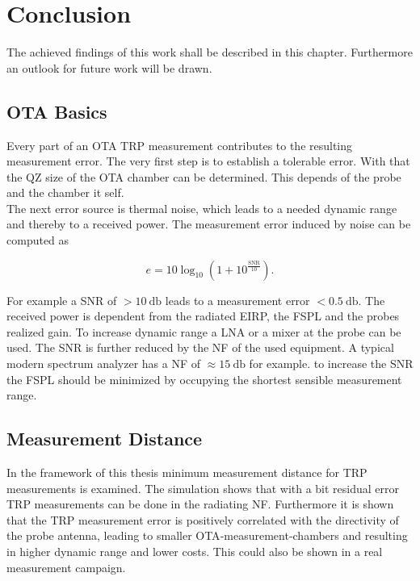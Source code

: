 \chapter{Conclusion}

The achieved findings of this work shall be described in this chapter. Furthermore an outlook for future work will be drawn.

\section{OTA Basics}

Every part of an \acf{OTA} \acf{TRP} measurement contributes to the resulting measurement error. The very first step is to establish a tolerable error. With that the \acf{QZ} size of the \ac{OTA} chamber can be determined. This depends of the probe and the chamber it self.\\
The next error source is thermal noise, which leads to a needed dynamic range and thereby to a received power. The measurement error induced by noise can be computed as 

\begin{equation}
e = 10\log_{10}\left(1+10^{\frac{\text{SNR}}{10}}\right).
\end{equation}

For example a \acf{SNR} of $>\SI{10}{\decibel}$ leads to a measurement error $<\SI{0.5}{\decibel}$. The received power is dependent from the radiated \ac{EIRP}, the \acf{FSPL} and the probes realized gain. To increase dynamic range a \acf{LNA} or a mixer at the probe can be used. The \ac{SNR} is further reduced by the \acf{NF} of the used equipment. A typical modern spectrum analyzer has a \ac{NF} of $\approx\SI{15}{\decibel}$ for example. to increase the \ac{SNR} the \ac{FSPL} should be minimized by occupying the shortest sensible measurement range.

\section{Measurement Distance}

In the framework of this thesis minimum measurement distance for \acf{TRP} measurements is examined. The simulation shows that with a bit residual error \ac{TRP} measurements can be done in the radiating \acf{NF}. Furthermore it is shown that the \ac{TRP} measurement error is positively correlated with the directivity of the probe antenna, leading to smaller \ac{OTA}-measurement-chambers and resulting in higher dynamic range and lower costs. This could also be shown in a real measurement campaign.

